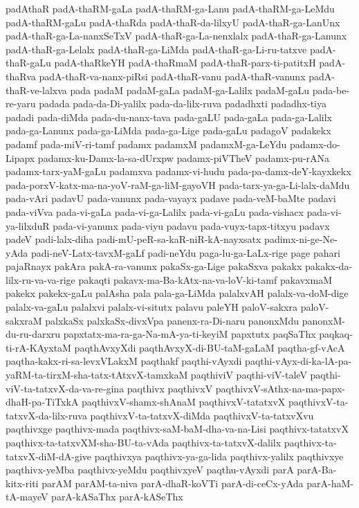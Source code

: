{padAthaR
padA-thaRM-gaLa
padA-thaRM-ga-Lanu
padA-thaRM-ga-LeMdu
padA-thaRM-gaLu
padA-thaRda
padA-thaR-da-lilxyU
padA-thaR-ga-LanUnx
padA-thaR-ga-La-nanxSeTxV
padA-thaR-ga-La-nenxlalx
padA-thaR-ga-Lanunx
padA-thaR-ga-Lelalx
padA-thaR-ga-LiMda
padA-thaR-ga-Li-ru-tatxve
padA-thaR-gaLu
padA-thaRkeYH
padA-thaRmaM
padA-thaR-parx-ti-patitxH
padA-thaRva
padA-thaR-va-nanx-piRsi
padA-thaR-vanu
padA-thaR-vanunx
padA-thaR-ve-lalxva
pada
padaM
padaM-gaLa
padaM-ga-Lalilx
padaM-gaLu
pada-be-re-yaru
padada
pada-da-Di-yalilx
pada-da-lilx-ruva
padadhxti
padadhx-tiya
padadi
pada-diMda
pada-du-nanx-tava
pada-gaLU
pada-gaLa
pada-ga-Lalilx
pada-ga-Lanunx
pada-ga-LiMda
pada-ga-Lige
pada-gaLu
padagoV
padakekx
padamf
pada-miV-ri-tamf
padamx
padamxM
padamxM-ga-LeYdu
padamx-do-Lipapx
padamx-ku-Damx-la-sa-dUrxpw
padamx-piVTheV
padamx-pu-rANa
padamx-tarx-yaM-gaLu
padamxva
padamx-vi-hudu
pada-pa-damx-deY-kayxkekx
pada-porxV-katx-ma-na-yoV-raM-ga-liM-gayoVH
pada-tarx-ya-ga-Li-lalx-daMdu
pada-vAri
padavU
pada-vanunx
pada-vayayx
padave
pada-veM-baMte
padavi
pada-viVva
pada-vi-gaLa
pada-vi-ga-Lalilx
pada-vi-gaLu
pada-vishacx
pada-vi-ya-lilxduR
pada-vi-yanunx
pada-viyu
padavu
pada-vuyx-tapx-titxyu
padavx
padeV
padi-lalx-diha
padi-mU-peR-sa-kaR-niR-kA-nayxsatx
padimx-ni-ge-Ne-yAda
padi-neV-Latx-tavxM-gaLf
padi-neYdu
paga-lu-ga-LaLx-rige
page
pahari
pajaRnayx
pakAra
pakA-ra-vanunx
pakaSx-ga-Lige
pakaSxva
pakakx
pakakx-da-lilx-ru-va-va-rige
pakaqti
pakavx-ma-Ba-kAtx-na-va-loV-ki-tamf
pakavxmaM
pakekx
pakekx-gaLu
palAsha
pala
pala-ga-LiMda
palalxvAH
palalx-va-doM-dige
palalx-va-gaLu
palalxvi
palalx-vi-situtx
palavu
paleYH
paloV-sakxra
paloV-sakxraM
palxkaSx
palxkaSx-divxVpa
panenx-ra-Di-naru
panonxMdu
panonxM-du-ru-darxru
papxtatx-ma-ra-ga-Na-mA-ya-ti-keyiM
papxtutx
paqSaThx
paqkaq-ti-rA-KAyxtaM
paqthAvxyXdi
paqthAvxyX-di-BU-taM-gaLaM
paqtha-gf-vAcA
paqtha-kakx-ri-sa-levxVLakxM
paqthakf
paqthi-vAyxdi
paqthi-vAyx-di-ka-lA-pa-yaRM-ta-tirxM-sha-tatx-tAtxvX-tamxkaM
paqthiviV
paqthi-viV-taleV
paqthi-viV-ta-tatxvX-da-va-re-gina
paqthivx
paqthivxV
paqthivxV-sAthx-na-ma-papx-dhaH-pa-TiTxkA
paqthivxV-shamx-shAnaM
paqthivxV-tatatxvX
paqthivxV-ta-tatxvX-da-lilx-ruva
paqthivxV-ta-tatxvX-diMda
paqthivxV-ta-tatxvXvu
paqthivxge
paqthivx-mada
paqthivx-saM-baM-dha-va-na-Lisi
paqthivx-tatatxvX
paqthivx-ta-tatxvXM-sha-BU-ta-vAda
paqthivx-ta-tatxvX-dalilx
paqthivx-ta-tatxvX-diM-dA-give
paqthivxya
paqthivx-ya-ga-lida
paqthivx-yalilx
paqthivxye
paqthivx-yeMba
paqthivx-yeMdu
paqthivxyeV
paqthu-vAyxdi
parA
parA-Ba-kitx-riti
parAM
parAM-ta-niva
parA-dhaR-koVTi
parA-di-ceCx-yAda
parA-haM-tA-mayeV
parA-kASaThx
parA-kASeThx
}

